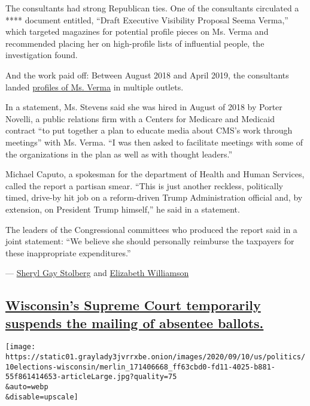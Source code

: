 The consultants had strong Republican ties. One of the consultants
circulated a **** document entitled, ``Draft Executive Visibility
Proposal Seema Verma,'' which targeted magazines for potential profile
pieces on Ms. Verma and recommended placing her on high-profile lists of
influential people, the investigation found.

And the work paid off: Between August 2018 and April 2019, the
consultants landed
\href{https://www.aarp.org/health/medicare-insurance/info-2019/cms-seema-verma-interview.html}{profiles
of Ms. Verma} in multiple outlets.

In a statement, Ms. Stevens said she was hired in August of 2018 by
Porter Novelli, a public relations firm with a Centers for Medicare and
Medicaid contract ``to put together a plan to educate media about CMS's
work through meetings'' with Ms. Verma. ``I was then asked to facilitate
meetings with some of the organizations in the plan as well as with
thought leaders.''

Michael Caputo, a spokesman for the department of Health and Human
Services, called the report a partisan smear. ``This is just another
reckless, politically timed, drive-by hit job on a reform-driven Trump
Administration official and, by extension, on President Trump himself,''
he said in a statement.

The leaders of the Congressional committees who produced the report said
in a joint statement: ``We believe she should personally reimburse the
taxpayers for these inappropriate expenditures.''

---
\href{https://www.nytimes3xbfgragh.onion/by/sheryl-gay-stolberg}{Sheryl
Gay Stolberg} and
\href{https://www.nytimes3xbfgragh.onion/by/elizabeth-williamson}{Elizabeth
Williamson}

\hypertarget{wisconsins-supreme-court-temporarily-suspends-the-mailing-of-absentee-ballots}{%
\subsection{\texorpdfstring{\protect\hyperlink{wisconsins-supreme-court-temporarily-suspends-the-mailing-of-absentee-ballots}{Wisconsin's
Supreme Court temporarily suspends the mailing of absentee
ballots.}}{Wisconsin's Supreme Court temporarily suspends the mailing of absentee ballots.}}\label{wisconsins-supreme-court-temporarily-suspends-the-mailing-of-absentee-ballots}}

\texttt{[image: https://static01.graylady3jvrrxbe.onion/images/2020/09/10/us/politics/10elections-wisconsin/merlin\_171406668\_ff63cbd0-fd11-4025-b881-55f861414653-articleLarge.jpg?quality=75\\\&auto=webp\\\&disable=upscale]}

